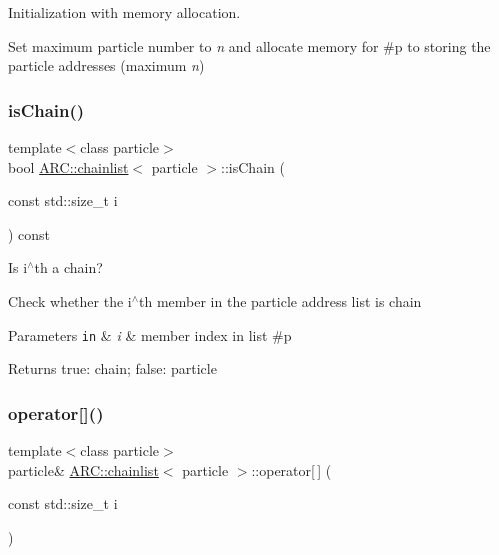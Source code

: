 Initialization with memory allocation. 

Set maximum particle number to {\itshape n} and allocate memory for \#p to storing the particle addresses (maximum {\itshape n}) \hypertarget{classARC_1_1chainlist_a192f6db3659e5329d137de18c8c4b029}{}\label{classARC_1_1chainlist_a192f6db3659e5329d137de18c8c4b029} 
\subsubsection{\texorpdfstring{is\+Chain()}{isChain()}}
{\footnotesize\ttfamily template$<$class particle$>$ \\
bool \hyperlink{classARC_1_1chainlist}{A\+R\+C\+::chainlist}$<$ particle $>$\+::is\+Chain (\begin{DoxyParamCaption}\item[{const std\+::size\+\_\+t}]{i }\end{DoxyParamCaption}) const\hspace{0.3cm}{\ttfamily [inline]}}



Is i$^\wedge$th a chain? 

Check whether the i$^\wedge$th member in the particle address list is chain 
\begin{DoxyParams}[1]{Parameters}
\mbox{\tt in}  & {\em i} & member index in list \#p \\
\hline
\end{DoxyParams}
\begin{DoxyReturn}{Returns}
true\+: chain; false\+: particle 
\end{DoxyReturn}
\hypertarget{classARC_1_1chainlist_a256df9d527eb305e14207f1ae476685c}{}\label{classARC_1_1chainlist_a256df9d527eb305e14207f1ae476685c} 
\subsubsection{\texorpdfstring{operator[]()}{operator[]()}}
{\footnotesize\ttfamily template$<$class particle$>$ \\
particle\& \hyperlink{classARC_1_1chainlist}{A\+R\+C\+::chainlist}$<$ particle $>$\+::operator\mbox{[}$\,$\mbox{]} (\begin{DoxyParamCaption}\item[{const std\+::size\+\_\+t}]{i }\end{DoxyParamCaption})\hspace{0.3cm}{\ttfamily [inline]}}



